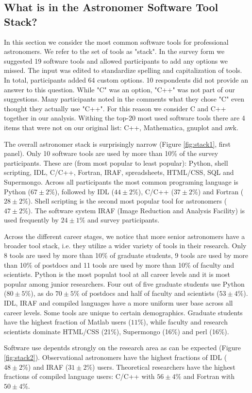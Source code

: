 
\subsection{What is in the Astronomer Software Tool Stack?}

In this section we consider the most common software tools for professional astronomers. We refer to the set of tools as "stack". In the survey form we suggested 19 software tools and allowed participants to add any options we missed. The input was edited to standardize spelling and capitalization of tools. In total, participants added 64 custom options. 10 respondents did not provide an answer to this question. While "C" was an option, "C++" was not part of our suggestions. Many participants noted in the comments what they chose "C" even thought they actually use "C++". For this reason we consider C and C++ together in our analysis. Withing the top-20 most used software tools there are 4 items that were not on our original list: C++, Mathematica, gnuplot and awk.

The overall astronomer stack is surprisingly narrow (Figure \ref{fig:stack1}, first panel). Only 10 software tools are used by more than 10\% of the survey participants. These are (from most popular to least popular): Python, shell scripting, IDL, C/C++, Fortran, IRAF, spreadsheets, HTML/CSS, SQL and Supermongo. Across all participants the most common programing language is Python ($67\pm2\%$), followed by IDL ($44\pm2\%$), C/C++ ($37\pm2\%$) and Fortran ($28\pm2\%$). Shell scripting is the second most popular tool for astronomers ($47\pm2\%$). The software system IRAF (Image Reduction and Analysis Facility) is used frequently by $24\pm1\%$ and survey participants. 

Across the different career stages, we notice that more senior astronomers have a broader tool stack, i.e. they utilize a wider variety of tools in their research. Only 8 tools are used by more than 10\% of graduate students, 9 tools are used by more than 10\% of postdocs and 11 tools are used by more than 10\% of faculty and scientists. Python is the most populat tool at all career levels and it is most popular among junior researchers. Four out of five graduate students use Python ($80\pm5\%$), as do $70\pm5\%$ of postdocs and half of faculty and scientists ($53\pm4\%$). IDL, IRAF and compiled languages have a more uniform user base across all career levels. Some tools are unique to certain demographics. Graduate students have the highest fraction of Matlab users ($11\%$), while faculty and research scientists dominate HTML/CSS (21\%), Supermongo (16\%) and perl (16\%).

Software use depentds strongly on the research area as can be expected (Figure \ref{fig:stack2}). Observational astronomers have the highest fractions of IDL ($48\pm2\%$) and IRAF ($31\pm2\%$) users. Theoretical researchers have the highest fractions of compiled language users: C/C++ with $56\pm4\%$ and Fortran with $50\pm4\%$. 